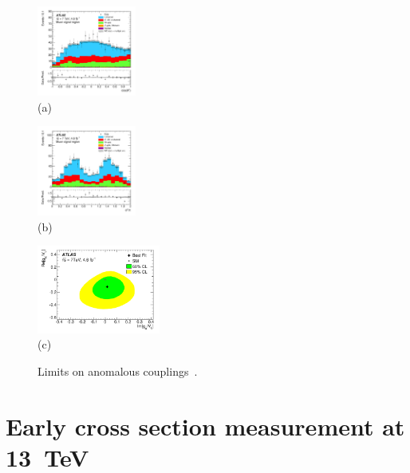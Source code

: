 \documentclass{PoS}
\begin{document}
%
\begin{figure}[htbp]
\begin{center}
\parbox[t]{0.3\textwidth}{\centering\includegraphics[width=0.29\textwidth]{atlas_anomcoupl/theta.pdf}\\(a)}
\parbox[t]{0.3\textwidth}{\centering\includegraphics[width=0.29\textwidth]{atlas_anomcoupl/phi.pdf}\\(b)}
\parbox[t]{0.38\textwidth}{\centering\includegraphics[width=0.36\textwidth]{atlas_anomcoupl/limits.pdf}\\(c)}
\end{center}
\caption{Limits on anomalous couplings~\cite{atlas-anomcoupl}.}
\end{figure}

\section{Early cross section measurement at 13~TeV}
\end{document}
